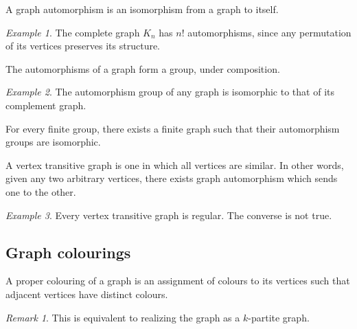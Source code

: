 \documentclass[11pt]{article}
\theoremstyle{definition}
\theoremstyle{remark}
\newtheorem*{remark}{Remark}
\newtheorem*{example}{Example}
\numberwithin{equation}{section}
\begin{document}
    \begin{definition}
        A graph automorphism is an isomorphism from a graph to itself.
    \end{definition}
    \begin{example}
        The complete graph $K_n$ has $n!$ automorphisms, since any permutation of its
        vertices preserves its structure.
    \end{example}

    \begin{lemma}
        The automorphisms of a graph form a group, under composition.
    \end{lemma}
    \begin{example}
        The automorphism group of any graph is isomorphic to that of its complement
        graph.
    \end{example}

    \begin{theorem}[Frucht]
        For every finite group, there exists a finite graph such that their
        automorphism groups are isomorphic.
    \end{theorem}

    \begin{definition}
        A vertex transitive graph is one in which all vertices are similar. In other
        words, given any two arbitrary vertices, there exists graph automorphism
        which sends one to the other.
    \end{definition}
    \begin{example}
        Every vertex transitive graph is regular. The converse is not true.
    \end{example}



    \subsection{Graph colourings}

    \begin{definition}
        A proper colouring of a graph is an assignment of colours to its vertices
        such that adjacent vertices have distinct colours.
        \begin{remark}
            This is equivalent to realizing the graph as a $k$-partite graph.
        \end{remark}
    \end{definition}
\end{document}
